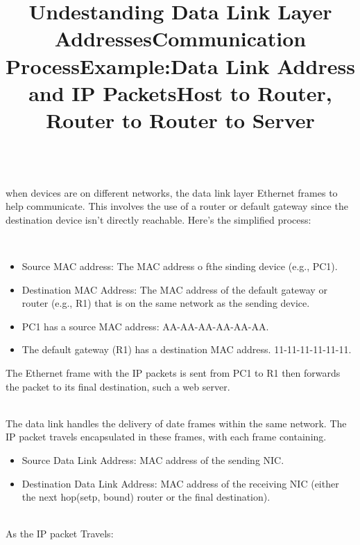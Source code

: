 \documentclass[a4paper,11pt]{article}
\begin{document}
\title{Undestanding Data Link Layer Addresses}\\
when devices are on different networks, the data link layer Ethernet frames to help communicate. This involves the use of a router or default gateway since the destination device isn't directly reachable. Here's the simplified process:\\

\title{Communication Process}\\
\begin{itemize}
    \item Source MAC address: The MAC address o fthe sinding device (e.g., PC1).\\
    \item Destination MAC Address: The MAC address of the default gateway or router (e.g., R1) that is on the same network as the sending device.\\
\end{itemize}

\title{Example:}
\begin{itemize}
    \item PC1 has a source MAC address: AA-AA-AA-AA-AA-AA.\\
    \item The default gateway (R1) has a destination MAC address. 11-11-11-11-11-11.\\
\end{itemize}

The Ethernet frame with the IP packets is sent from PC1 to R1 then forwards the packet to its final destination, such a web server.\\

\title{Data Link Address and IP  Packets}\\
The data link handles the delivery of date frames within the same network. The IP packet travels encapsulated in these frames, with each frame containing.\\

\begin{itemize}
    \item Source Data Link Address: MAC address of the sending NIC.\\
    \item Destination Data Link Address: MAC address of the receiving NIC (either the next hop(setp, bound) router or the final destination).\\
\end{itemize}

\title{Host to Router, Router to Router to Server}\\
As the IP packet Travels:\\
\end{document}
